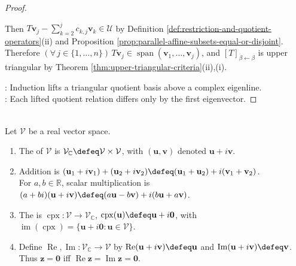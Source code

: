 \begin{theorem}
\begin{proof}
\begin{enumerate}[label=(\roman*)]
Then $T\mathbf{v}_j-\sum\limits_{k=2}^{j}c_{k,j}\mathbf{v}_k\in\mathcal{U}$ by Definition \ref{def:restriction-and-quotient-operators}(ii) and Proposition \ref{prop:parallel-affine-subsets-equal-or-disjoint}.\\
Therefore $(\forall\,j\in\{1,\ldots,n\})\,T\mathbf{v}_j\in\operatorname{span}(\mathbf{v}_1,\ldots,\mathbf{v}_j)$, and $[T]_{\beta\leftarrow\beta}$ is upper triangular by Theorem \ref{thm:upper-triangular-criteria}(ii),(i).
\end{enumerate}
: Induction lifts a triangular quotient basis above a complex eigenline.\\
: Each lifted quotient relation differs only by the first eigenvector.
\end{proof}
\end{theorem}

\begin{definition} \label{def:complexification-real-vector-space} \\
Let $\mathcal{V}$ be a real vector space.
\begin{enumerate}[label=(\roman*)]
\setlength{\itemsep}{0pt}
\item The  of $\mathcal{V}$ is $\mathcal{V}_{\mathbb{C}}\defeq\mathcal{V}\times\mathcal{V}$, with $(\mathbf{u},\mathbf{v})$ denoted $\mathbf{u}+i\mathbf{v}$.
\item Addition is $(\mathbf{u}_1+i\mathbf{v}_1)+(\mathbf{u}_2+i\mathbf{v}_2)\defeq(\mathbf{u}_1+\mathbf{u}_2)+i(\mathbf{v}_1+\mathbf{v}_2)$.\\
For $a,b\in\mathbb{R}$, scalar multiplication is $(a+bi)(\mathbf{u}+i\mathbf{v})\defeq(a\mathbf{u}-b\mathbf{v})+i(b\mathbf{u}+a\mathbf{v})$.
\item The  is $\operatorname{cpx}:\mathcal{V}\to\mathcal{V}_{\mathbb{C}}$, $\operatorname{cpx}(\mathbf{u})\defeq\mathbf{u}+i\mathbf{0}$, with $\operatorname{im}(\operatorname{cpx})=\{\mathbf{u}+i\mathbf{0}:\mathbf{u}\in\mathcal{V}\}$.
\item Define $\operatorname{Re},\operatorname{Im}:\mathcal{V}_{\mathbb{C}}\to\mathcal{V}$ by $\operatorname{Re}(\mathbf{u}+i\mathbf{v})\defeq\mathbf{u}$ and $\operatorname{Im}(\mathbf{u}+i\mathbf{v})\defeq\mathbf{v}$. Thus $\mathbf{z}=\mathbf{0}$ iff $\operatorname{Re}\mathbf{z}=\operatorname{Im}\mathbf{z}=\mathbf{0}$.
\end{enumerate}
\end{definition}

